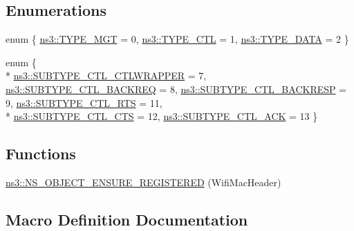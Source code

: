 \subsection*{Enumerations}
\begin{DoxyCompactItemize}
\item 
enum \{ \hyperlink{namespacens3_a603b558354194a90924d823ee16714d5afd692263674e4de879dc6068193e9109}{ns3\+::\+T\+Y\+P\+E\+\_\+\+M\+GT} = 0, 
\hyperlink{namespacens3_a603b558354194a90924d823ee16714d5a6bf551e888b66c99bac335b629e3001c}{ns3\+::\+T\+Y\+P\+E\+\_\+\+C\+TL} = 1, 
\hyperlink{namespacens3_a603b558354194a90924d823ee16714d5ace459369ba2281ec0104b630b8cf629b}{ns3\+::\+T\+Y\+P\+E\+\_\+\+D\+A\+TA} = 2
 \}
\item 
enum \{ \\*
\hyperlink{namespacens3_aa24b45de2def7021cdc3a2a7f81e798fa989d6e8853dba12d0c29ef502e30296f}{ns3\+::\+S\+U\+B\+T\+Y\+P\+E\+\_\+\+C\+T\+L\+\_\+\+C\+T\+L\+W\+R\+A\+P\+P\+ER} = 7, 
\hyperlink{namespacens3_aa24b45de2def7021cdc3a2a7f81e798fa7393d094f91c33827540e0eaa4efe388}{ns3\+::\+S\+U\+B\+T\+Y\+P\+E\+\_\+\+C\+T\+L\+\_\+\+B\+A\+C\+K\+R\+EQ} = 8, 
\hyperlink{namespacens3_aa24b45de2def7021cdc3a2a7f81e798facc6404a03404cf243af815cf6b5fca8c}{ns3\+::\+S\+U\+B\+T\+Y\+P\+E\+\_\+\+C\+T\+L\+\_\+\+B\+A\+C\+K\+R\+E\+SP} = 9, 
\hyperlink{namespacens3_aa24b45de2def7021cdc3a2a7f81e798facdc78d918ebab4827677549a19388eb3}{ns3\+::\+S\+U\+B\+T\+Y\+P\+E\+\_\+\+C\+T\+L\+\_\+\+R\+TS} = 11, 
\\*
\hyperlink{namespacens3_aa24b45de2def7021cdc3a2a7f81e798fac3752303cca5b84bda65397ad2327308}{ns3\+::\+S\+U\+B\+T\+Y\+P\+E\+\_\+\+C\+T\+L\+\_\+\+C\+TS} = 12, 
\hyperlink{namespacens3_aa24b45de2def7021cdc3a2a7f81e798faf58b2445febaa7361a639c1a78768581}{ns3\+::\+S\+U\+B\+T\+Y\+P\+E\+\_\+\+C\+T\+L\+\_\+\+A\+CK} = 13
 \}
\end{DoxyCompactItemize}
\subsection*{Functions}
\begin{DoxyCompactItemize}
\item 
\hyperlink{namespacens3_ab61c626383278093f1a8c51e983d4e9d}{ns3\+::\+N\+S\+\_\+\+O\+B\+J\+E\+C\+T\+\_\+\+E\+N\+S\+U\+R\+E\+\_\+\+R\+E\+G\+I\+S\+T\+E\+R\+ED} (Wifi\+Mac\+Header)
\end{DoxyCompactItemize}


\subsection{Macro Definition Documentation}
